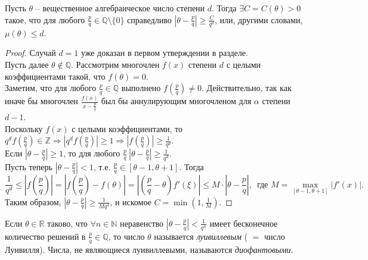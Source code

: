 \begin{theorem}[Лиувилля]  \label{l9_Liouv}
	Пусть $\theta$ -- вещественное алгебраическое число степени $d$. Тогда $\exists C = C(\theta) > 0$ такое, что для любого $\displaystyle \frac{p}{q} \in \mathbb{Q} \setminus \lbrace 0 \rbrace$ справедливо $\displaystyle \left|\theta - \frac{p}{q}\right| \geq \frac{C}{q^d}$, или, другими словами, $\mu(\theta) \leq d$.
\end{theorem}
\begin{proof}
	Случай $d = 1$ уже доказан в первом утверждении в разделе.\\
	Пусть далее $\theta \not \in \mathbb{Q}$. Рассмотрим многочлен $f(x)$ степени $d$ с целыми коэффициентами такой, что $f(\theta) = 0$.\\
	Заметим, что для любого $\displaystyle \frac{p}{q} \in \mathbb{Q}$ выполнено $\displaystyle f\left(\frac{p}{q}\right) \ne 0$. Действительно, так как иначе бы многочлен $\displaystyle \frac{f(x)}{x - \frac{p}{q}}$ был бы аннулирующим многочленом для $\alpha$ степени $d - 1$.\\
	Поскольку $f(x)$ с целыми коэффициентами, то $\displaystyle q^d f\left(\frac{p}{q}\right) \in \mathbb{Z} \Rightarrow \left| q^d f\left(\frac{p}{q}\right) \right| \geq 1 \Rightarrow \left| f\left(\frac{p}{q}\right) \right| \geq \frac{1}{q^d}$.\\
	Если $\displaystyle \left| \theta - \frac{p}{q} \right| \geq 1$, то для любого $\displaystyle \frac{p}{q} \ \left|\theta - \frac{p}{q}\right| \geq \frac{1}{q^d}$.\\
	Пусть теперь $\displaystyle \left|\theta - \frac{p}{q}\right| < 1$, т.е. $\displaystyle \frac{p}{q} \in [\theta - 1, \theta + 1]$. Тогда
	$$\frac{1}{q^d} \leq \left| f\left(\frac{p}{q}\right)\right| = \left|f\left(\frac{p}{q}\right) - f\left(\theta\right)\right| = \left|\left(\frac{p}{q} - \theta\right)f'(\xi)\right| \leq M \cdot \left| \theta - \frac{p}{q} \right|, \, \text{ где } M = \max\limits_{[\theta-1,\theta+1]}\left| f'(x) \right|.$$
	Таким образом, $\displaystyle \left| \theta - \frac{p}{q} \right| \geq \frac{1}{Mq^d}$, и искомое $\displaystyle C = \min(1, \frac{1}{M})$.
\end{proof}	

\begin{definition}
	Если $\theta \in \mathbb{R}$ таково, что $\forall n \in \mathbb{N}$ неравенство $\displaystyle \left|\theta - \frac{p}{q}\right| < \frac{1}{q^n}$ имеет бесконечное количество решений в $\displaystyle \frac{p}{q} \in \mathbb{Q}$, то число $\theta$  называется \textit{луивиллевым} ( $=$ число Луивилля). Числа, не являющиеся луивиллевыми, называются \textit{диофантовыми}.
\end{definition}


